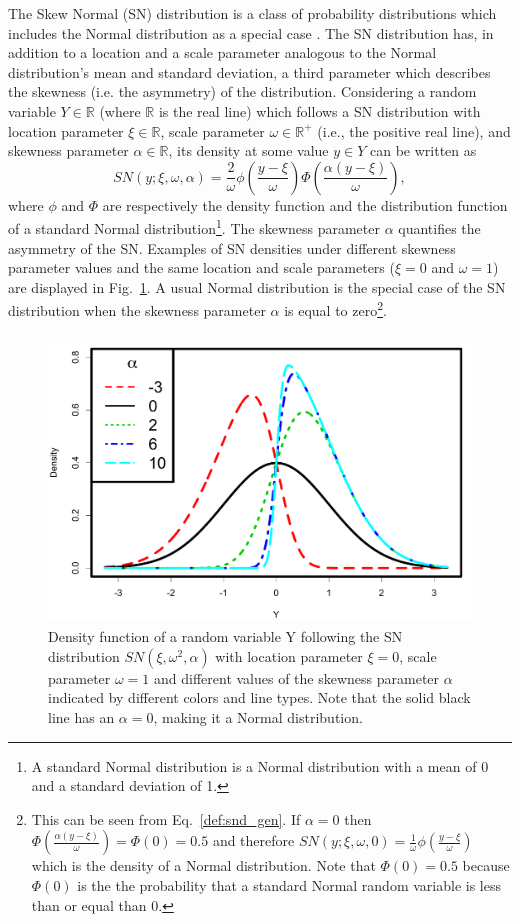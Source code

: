 \documentclass{aa}
\begin{document}
The Skew Normal (SN) distribution is a class of probability distributions which includes the Normal distribution as a special case \citep{Azzalini1985}. The SN distribution has, in addition to a location and a scale parameter analogous to the Normal distribution's mean and standard deviation, a third parameter which describes the skewness (i.e. the asymmetry) of the distribution. Considering a random variable $Y\in \mathbb R$ (where $\mathbb R$ is the real line) which follows a SN distribution with location parameter $\xi \in \mathbb R$, scale parameter $\omega \in \mathbb R^{+}$ (i.e., the positive real line), and skewness parameter $\alpha \in \mathbb R$, its density at some value $y\in Y$ can be written as 
\begin{equation} \label{def:snd_gen}
SN(y;\xi, \omega, \alpha) = \frac{2}{\omega} \phi\left(\frac{y-\xi}{\omega}\right) \Phi\left(\frac{\alpha(y-\xi)}{\omega}\right),
\end{equation}
where $\phi$ and $\Phi$ are respectively the density function and the distribution function of a standard Normal distribution\footnote{A standard Normal distribution is a Normal distribution with a mean of 0 and a standard deviation of 1.}.
The skewness parameter $\alpha$ quantifies the asymmetry of the SN. 
Examples of SN densities under different skewness parameter values and the same location and scale parameters ($\xi = 0$ and $\omega = 1$) are displayed in Fig.~\ref{fig:SN.plot}.  A usual Normal distribution is the special case of the SN distribution when the skewness parameter $\alpha$ is equal to zero\footnote{This can be seen from Eq.~\ref{def:snd_gen}. If $\alpha = 0$ then $\Phi\left(\frac{\alpha(y-\xi)}{\omega}\right) = \Phi(0) = 0.5$ and therefore $SN(y;\xi, \omega, 0) = \frac{1}{\omega} \phi\left(\frac{y-\xi}{\omega}\right)$ which is the density of a Normal distribution. Note that $\Phi(0) = 0.5$ because $\Phi(0)$ is the the probability that a standard Normal random variable is less than or equal than 0.}.
%
\begin{figure}[htbp]
   \centering
\includegraphics[height = 3in]{Skew_Normal_densities_jjck.pdf} 
   \caption{Density function of a random variable Y following the SN distribution $SN(\xi, \omega^{2}, \alpha)$ with location parameter $\xi = 0$, scale parameter $\omega = 1$ and different values of the skewness parameter $\alpha$ indicated by different colors and line types. Note that the solid black line has an $\alpha = 0$, making it a Normal distribution.}
   \label{fig:SN.plot}
\end{figure}
\end{document}
